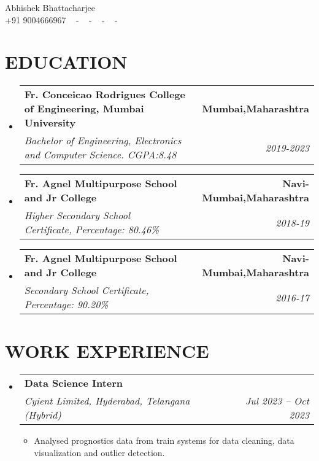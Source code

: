\documentclass[letterpaper,11pt]{article}
\makeatletter
\newcommand{\resumeItem}[1]{
  \item\small{
    {#1 \vspace{-1pt}}
  }
}
\newcommand{\resumeSubheading}[4]{
  \vspace{-2pt}\item
    \begin{tabular*}{1.0\textwidth}[t]{l@{\extracolsep{\fill}}r}
      \textbf{\large#1} & \textbf{\small #2} \\
      \textit{\large#3} & \textit{\small #4} \\
      
    \end{tabular*}\vspace{-7pt}
}
\newcommand{\resumeSubHeadingListStart}{\begin{itemize}[leftmargin=0.0in, label={}]}
\newcommand{\resumeSubHeadingListEnd}{\end{itemize}}
\newcommand{\resumeItemListStart}{\begin{itemize}[leftmargin=0.1in]}
\newcommand{\resumeItemListEnd}{\end{itemize}\vspace{-5pt}}
\makeatother
\begin{document}


\begin{center}
    {\huge Abhishek Bhattacharjee} \\ \vspace{2pt} 
    {+91 9004666967} ~ 
    \small{-}
    \href{[https://abhishek-tech.com/]}{\color{blue}{Portfolio}} ~ 
    \small{-}
    \href{mailto:[abhishek.bh777@gmail.com]}{\color{blue}{abhishek.bh777@gmail.com}} ~ 
    \small{-}
    \href{[https://www.linkedin.com/in/abhib7/]}{ \color{blue}{linkedin.com/in/abhib7}}  ~
    \small{-}
    \href{[https://github.com/AbhiB7]}{ \color{blue}{github.com/AbhiB7}} ~
    \vspace{-7pt}
\end{center}

\section{\color{airforceblue}EDUCATION}
  \resumeSubHeadingListStart
    \resumeSubheading
      {Fr. Conceicao Rodrigues College of Engineering, Mumbai University}{Mumbai,Maharashtra}
      {Bachelor of Engineering, Electronics and Computer Science. CGPA:8.48}{2019-2023}
    \vspace{-4pt}
     \resumeSubheading
      {Fr. Agnel Multipurpose School and Jr College}{Navi-Mumbai,Maharashtra}
      {Higher Secondary School Certificate, Percentage: 80.46\%}{2018-19}
 \resumeSubheading
      {Fr. Agnel Multipurpose School and Jr College}{Navi-Mumbai,Maharashtra}
      {Secondary School Certificate, Percentage: 90.20\%}{2016-17}
  \resumeSubHeadingListEnd
  \vspace{-10pt}


 
\section{\color{airforceblue}WORK EXPERIENCE}
  \resumeSubHeadingListStart

    \resumeSubheading
      {Data Science Intern}{} 
      {Cyient Limited, Hyderabad, Telangana (Hybrid)}{Jul 2023 – Oct 2023}
      \resumeItemListStart
            \resumeItem{\normalsize{ Analysed prognostics data from train systems for data cleaning, data visualization and outlier detection.}}
      \resumeItemListEnd  
  \resumeSubHeadingListEnd
\vspace{-12pt}
\end{document}
